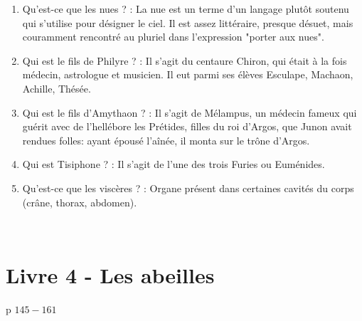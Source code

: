 \documentclass[a4paper, 11pt, hidelinks]{article}
\begin{document}
\begin{enumerate}
      \item Qu'est-ce que les nues ? : La nue est un terme d'un langage plutôt soutenu qui s'utilise pour désigner le ciel. Il est assez littéraire, presque désuet, mais couramment rencontré au pluriel dans l'expression "porter aux nues".
      \item Qui est le fils de Philyre ? : Il s'agit du centaure Chiron, qui était à la fois médecin, astrologue et musicien. Il eut parmi ses élèves
            Esculape, Machaon, Achille, Thésée.
      \item Qui est le fils d'Amythaon ? : Il s'agit de Mélampus, un médecin fameux qui guérit avec de l'hellébore les Prétides, filles du roi d'Argos, que Junon avait rendues folles: ayant épousé l'aînée, il monta sur le trône d'Argos.
      \item Qui est Tisiphone ? : Il s'agit de l'une des trois Furies ou Euménides.
      \item Qu'est-ce que les viscères ? : Organe présent dans certaines cavités du corps (crâne, thorax, abdomen).
\end{enumerate}



 \section{Livre 4 - Les abeilles}

p $145 - 161$
\end{document}
